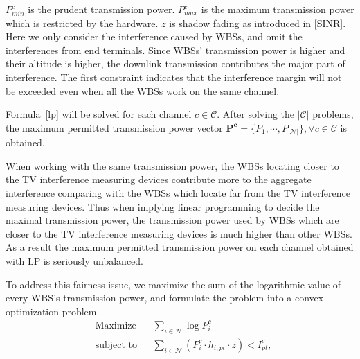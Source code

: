 
$P_{min}^c$ is the prudent transmission power. %
$P_{max}^c$ is the maximum transmission power which is restricted by the hardware.
$z$ is shadow fading as introduced in \ref{SINR}.
Here we only consider the interference caused by WBSs, and omit the interferences from end terminals. 
Since WBSs' transmission power is higher and their altitude is higher\cite{multipleIntf_pimrc11}, the downlink transmission contributes the major part of interference\cite{infmitigate07mobicom}.
The first constraint indicates that the interference margin will not be exceeded even when all the WBSs work on the same channel.


Formula~\ref{lp} will be solved for each channel $c\in \mathcal{C}$.
After solving the $|\mathcal{C}|$ problems, the maximum permitted transmission power vector $\bm{P^c} =\{P_1,\cdots,P_{|\mathcal{N}|}\}, \forall c\in \mathcal{C}$ is obtained.

When working with the same transmission power, the WBSs locating closer to the TV interference measuring devices contribute more to the aggregate interference comparing with the WBSs which locate far from the TV interference measuring devices.
Thus when implying linear programming to decide the maximal transmission power, the transmission power used by WBSs which are closer to the TV interference measuring devices is much higher than other WBSs.
As a result the maximum permitted transmission power on each channel obtained with LP is seriously unbalanced.

To address this fairness issue, we maximize the sum of the logarithmic value of every WBS's transmission power, and formulate the problem into a convex optimization problem.
	\begin{equation}
		\label{cvx}
		\begin{aligned}
		& {\text{Maximize}}
		& & \sum_{i\in \mathcal{N}} \log P^c_i \\
		& \text{subject to}
		& & \sum_{i\in \mathcal{N}} (P^c_i \cdot h_{i,pt}\cdot z) < I^c_{pt}, 
		\end{aligned}
	\end{equation}

